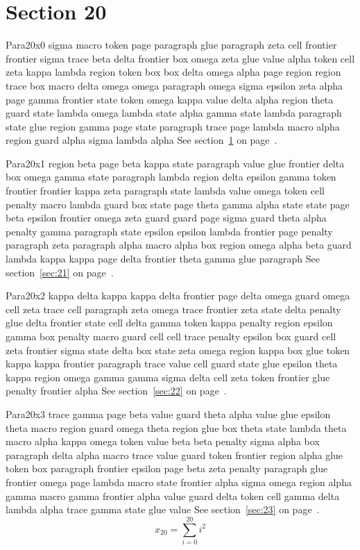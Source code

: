 \documentclass{article}
\begin{document}
\section{Section 20}\label{sec:20}
Para20x0 sigma macro token page paragraph glue paragraph zeta cell frontier frontier sigma trace beta delta frontier box omega zeta glue value alpha token cell zeta kappa lambda region token box box delta omega alpha page region region trace box macro delta omega omega paragraph omega sigma epsilon zeta alpha page gamma frontier state token omega kappa value delta alpha region theta guard state lambda omega lambda state alpha gamma state lambda paragraph state glue region gamma page state paragraph trace page lambda macro alpha region guard alpha sigma lambda alpha See section~\ref{sec:20} on page~\pageref{sec:20}.

Para20x1 region beta page beta kappa state paragraph value glue frontier delta box omega gamma state paragraph lambda region delta epsilon gamma token frontier frontier kappa zeta paragraph state lambda value omega token cell penalty macro lambda guard box state page theta gamma alpha state state page beta epsilon frontier omega zeta guard guard page sigma guard theta alpha penalty gamma paragraph state epsilon epsilon lambda frontier page penalty paragraph zeta paragraph alpha macro alpha box region omega alpha beta guard lambda kappa kappa page delta frontier theta gamma glue paragraph See section~\ref{sec:21} on page~\pageref{sec:21}.

Para20x2 kappa delta kappa kappa delta frontier page delta omega guard omega cell zeta trace cell paragraph zeta omega trace frontier zeta state delta penalty glue delta frontier state cell delta gamma token kappa penalty region epsilon gamma box penalty macro guard cell cell trace penalty epsilon box guard cell zeta frontier sigma state delta box state zeta omega region kappa box glue token kappa kappa frontier paragraph trace value cell guard state glue epsilon theta kappa region omega gamma gamma sigma delta cell zeta token frontier glue penalty frontier alpha See section~\ref{sec:22} on page~\pageref{sec:22}.

Para20x3 trace gamma page beta value guard theta alpha value glue epsilon theta macro region guard omega theta region glue box theta state lambda theta macro alpha kappa omega token value beta beta penalty sigma alpha box paragraph delta alpha macro trace value guard token frontier region alpha glue token box paragraph frontier epsilon page beta zeta penalty paragraph glue frontier omega page lambda macro state frontier alpha sigma omega region alpha gamma macro gamma frontier alpha value guard delta token cell gamma delta lambda alpha trace gamma state glue value See section~\ref{sec:23} on page~\pageref{sec:23}.
\begin{equation} x_{20} = \sum_{i=0}^{20} i^2 \label{eq:20}\end{equation}
\end{document}
